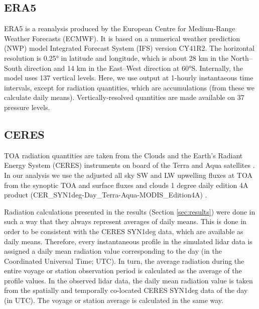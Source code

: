 \documentclass[12pt,a4paper]{article}
\begin{document}
\subsection{ERA5}

ERA5 \citep{era5} is a reanalysis produced by the European Centre for
Medium-Range Weather Forecasts (ECMWF). It is based on a numerical weather
prediction (NWP) model Integrated Forecast System (IFS) version CY41R2.  The
horizontal resolution is 0.25° in latitude and longitude, which is about 28 km
in the North--South direction and 14 km in the East--West direction at 60°S.
Internally, the model uses 137 vertical levels. Here, we use output at 1-hourly
instantaeous time intervals, except for radiation quantities, which are
accumulations (from these we calculate daily means).  Vertically-resolved
quantities are made available on 37 pressure levels.

\subsection{CERES}

TOA radiation quantities are taken from the Clouds and the Earth’s Radiant
Energy System (CERES) instruments on board of the Terra and Aqua satellites
\citep{wielicki1996,loeb2018}. In our analysis we use the adjusted all sky SW
and LW upwelling fluxes at TOA from the synoptic TOA and surface fluxes and
clouds 1 degree daily edition 4A product
(CER\_SYN1deg-Day\_Terra-Aqua-MODIS\_Edition4A)
\citep{doelling2013,doelling2016}.

Radiation calculations presented in the results (Section \ref{sec:results})
were done in such a way that they always represent averages of daily means.
This is done in order to be consistent with the CERES SYN1deg data, which are
available as daily means. Therefore, every instantaneous profile in the
simulated lidar data is assigned a daily mean radiation value corresponding to
the day (in the Coordinated Universal Time; UTC). In turn, the average
radiation during the entire voyage or station observation period is calculated
as the average of the profile values. In the observed lidar data, the daily
mean radiation value is taken from the spatially and temporally co-located
CERES SYN1deg data of the day (in UTC). The voyage or station average is
calculated in the same way.
\end{document}
